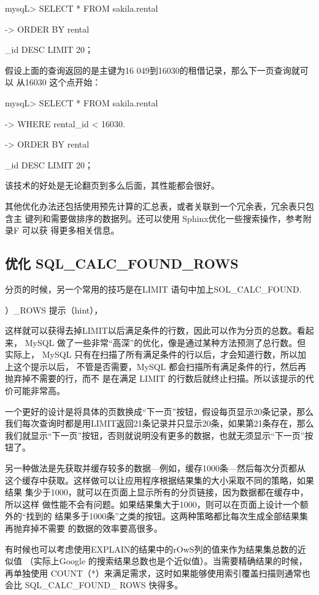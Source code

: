 mysqL> SELECT * FROM sakila.rental

-> ORDER BY rental

\_id DESC LIMIT 20；

假设上面的查询返回的是主键为16 049到16030的租借记录，那么下一页查询就可以
从16030 这个点开始：

mysqL> SELECT * FROM sakila.rental

-> WHERE rental\_id < 16030.

-> ORDER BY rental

\_id DESC LIMIT 20；

该技术的好处是无论翻页到多么后面，其性能都会很好。

其他优化办法还包括使用预先计算的汇总表，或者关联到一个冗余表，冗余表只包含主
键列和需要做排序的数据列。还可以使用 Sphinx优化一些搜索操作，参考附录F 可以获
得更多相关信息。

\subsection{优化 SQL\_CALC\_FOUND\_ROWS}
分页的时候，另一个常用的技巧是在LIMIT 语句中加上SOL\_CALC\_FOUND.

）\_ROWS 提示（hint），

这样就可以获得去掉LIMIT以后满足条件的行数，因此可以作为分页的总数。看起来，
MySQL 做了一些非常“高深”的优化，像是通过某种方法预测了总行数。但实际上，
MySQL 只有在扫描了所有满足条件的行以后，才会知道行数，所以加上这个提示以后，
不管是否需要，MySQL 都会扫描所有满足条件的行，然后再抛弃掉不需要的行，而不
是在满足 LIMIT 的行数后就终止扫描。所以该提示的代价可能非常高。

一个更好的设计是将具体的页数换成“下一页”按钮，假设每页显示20条记录，那么
我们每次查询时都是用LIMIT返回21条记录并只显示20条，如果第21条存在，那么
我们就显示“下一页”按钮，否则就说明没有更多的数据，也就无须显示“下一页”按
钮了。

另一种做法是先获取并缓存较多的数据—例如，缓存1000条—然后每次分页都从
这个缓存中获取。这样做可以让应用程序根据结果集的大小采取不同的策略，如果结果
集少于1000，就可以在页面上显示所有的分页链接，因为数据都在缓存中，所以这样
做性能不会有问题。如果结果集大于1000，则可以在页面上设计一个额外的“找到的
结果多于1000条”之类的按钮。这两种策略都比每次生成全部结果集再抛弃掉不需要
的数据的效率要高很多。

有时候也可以考虑使用EXPLAIN的结果中的rOwS列的值来作为结果集总数的近似值
（实际上Google 的搜索结果总数也是个近似值）。当需要精确结果的时候，再单独使用
COUNT（*）来满足需求，这时如果能够使用索引覆盖扫描则通常也会比 SQL\_CALC\_FOUND\_
ROWS 快得多。

